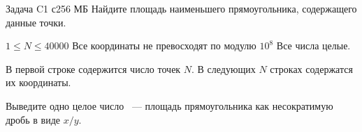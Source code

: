 \begin{problem}{Задача C}{1 с}{256 МБ}
Найдите площадь наименьшего прямоугольника, содержащего данные точки.
\Limit

$1 \le N \le 40000$
Все координаты не превосходят по модулю $10^8$
Все числа целые.

\InputFile
В первой строке содержится число точек $N$.
В следующих $N$ строках содержатся их координаты.

\OutputFile
Выведите одно целое число ~--- площадь прямоугольника как несократимую дробь
в виде $x/y$.

\Example
\begin{example}
\end{example}
\end{problem}
